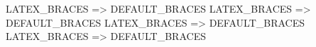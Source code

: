 {
    LATEX_BRACES => DEFAULT_BRACES
}
    LATEX_BRACES => DEFAULT_BRACES
{
    LATEX_BRACES => DEFAULT_BRACES
}
    LATEX_BRACES => DEFAULT_BRACES